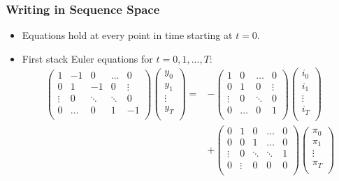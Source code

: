 \documentclass[english,xcolor=svgnames]{beamer}
\begin{document}
\begin{frame}
    \frametitle{Writing in Sequence Space}
    \begin{itemize}
        \item Equations hold at every point in time starting at $t=0$. 
        \item First stack Euler equations for $t=0,1,...,T$:
        \begin{align*}
        	\begin{pmatrix}
        		1 & -1 & 0 & \hdots & 0 \\
        		0 & 1 & -1 & 0 & \vdots \\
        		\vdots & 0 & \ddots & \ddots & 0 \\
        		0 & \hdots & 0 & 1 & -1 \\
        	\end{pmatrix}
        	\begin{pmatrix}
        		y_0 \\
        		y_1 \\
        		\vdots \\
        		y_T \\
        	\end{pmatrix}
        	=&-\begin{pmatrix}
        		1 & 0 & \hdots & 0  \\
        		0 & 1 & 0 & \vdots  \\
        		\vdots & 0 & \ddots & 0  \\
        		0 & \hdots & 0 & 1  \\
        	\end{pmatrix}
        	\begin{pmatrix}
        		i_0 \\
        		i_1 \\
        		\vdots \\
        		i_T \\
        	\end{pmatrix}
        	\\
        	&+ 
        	\begin{pmatrix}
        		0 & 1 & 0 & \hdots & 0 \\
        		0 & 0 & 1 & \hdots & 0 \\
        		\vdots & 0 & \ddots & \ddots & 1 \\
        		0 & \vdots & 0 & 0 & 0 \\
        	\end{pmatrix}
        	\begin{pmatrix}
        		\pi_0 \\
        		\pi_1 \\
        		\vdots \\
        		\pi_T \\
        	\end{pmatrix}
        \end{align*}
    \end{itemize}
\end{frame}
\end{document}
